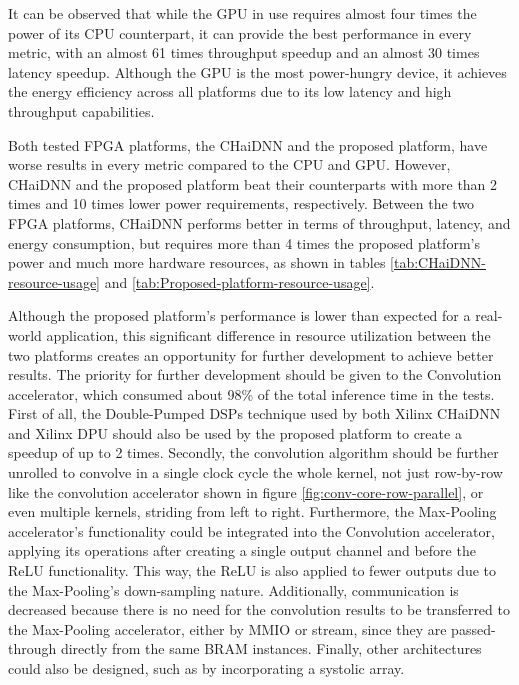 It can be observed that while the GPU in use requires almost four times the power of its CPU counterpart, it can provide the best performance in every metric, with an almost 61 times throughput speedup and an almost 30 times latency speedup. Although the GPU is the most power-hungry device, it achieves the energy efficiency across all platforms due to its low latency and high throughput capabilities.

Both tested FPGA platforms, the CHaiDNN and the proposed platform, have worse results in every metric compared to the CPU and GPU. However, CHaiDNN and the proposed platform beat their counterparts with more than 2 times and 10 times lower power requirements, respectively. Between the two FPGA platforms, CHaiDNN performs better in terms of throughput, latency, and energy consumption, but requires more than 4 times the proposed platform's power and much more hardware resources, as shown in tables \ref{tab:CHaiDNN-resource-usage} and \ref{tab:Proposed-platform-resource-usage}.

Although the proposed platform's performance is lower than expected for a real-world application, this significant difference in resource utilization between the two platforms creates an opportunity for further development to achieve better results. The priority for further development should be given to the Convolution accelerator, which consumed about 98\% of the total inference time in the tests. First of all, the Double-Pumped DSPs technique used by both Xilinx CHaiDNN and Xilinx DPU should also be used by the proposed platform to create a speedup of up to 2 times. Secondly, the convolution algorithm should be further unrolled to convolve in a single clock cycle the whole kernel, not just row-by-row like the convolution accelerator shown in figure \ref{fig:conv-core-row-parallel}, or even multiple kernels, striding from left to right. Furthermore, the Max-Pooling accelerator's functionality could be integrated into the Convolution accelerator, applying its operations after creating a single output channel and before the ReLU functionality. This way, the ReLU is also applied to fewer outputs due to the Max-Pooling's down-sampling nature. Additionally, communication is decreased because there is no need for the convolution results to be transferred to the Max-Pooling accelerator, either by MMIO or stream, since they are passed-through directly from the same BRAM instances. Finally, other architectures could also be designed, such as by incorporating a systolic array.
